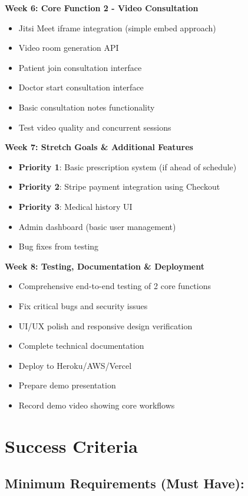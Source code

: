 \documentclass[11pt,a4paper]{article}
\begin{document}
\textbf{Week 6: Core Function 2 - Video Consultation}
\begin{itemize}[leftmargin=*, itemsep=0.05em]
    \item Jitsi Meet iframe integration (simple embed approach)
    \item Video room generation API
    \item Patient join consultation interface
    \item Doctor start consultation interface
    \item Basic consultation notes functionality
    \item Test video quality and concurrent sessions
\end{itemize}

\textbf{Week 7: Stretch Goals \& Additional Features}
\begin{itemize}[leftmargin=*, itemsep=0.05em]
    \item \textbf{Priority 1}: Basic prescription system (if ahead of schedule)
    \item \textbf{Priority 2}: Stripe payment integration using Checkout
    \item \textbf{Priority 3}: Medical history UI
    \item Admin dashboard (basic user management)
    \item Bug fixes from testing
\end{itemize}

\textbf{Week 8: Testing, Documentation \& Deployment}
\begin{itemize}[leftmargin=*, itemsep=0.05em]
    \item Comprehensive end-to-end testing of 2 core functions
    \item Fix critical bugs and security issues
    \item UI/UX polish and responsive design verification
    \item Complete technical documentation
    \item Deploy to Heroku/AWS/Vercel
    \item Prepare demo presentation
    \item Record demo video showing core workflows
\end{itemize}

\section{Success Criteria}

\subsection*{Minimum Requirements (Must Have):}
\end{document}
